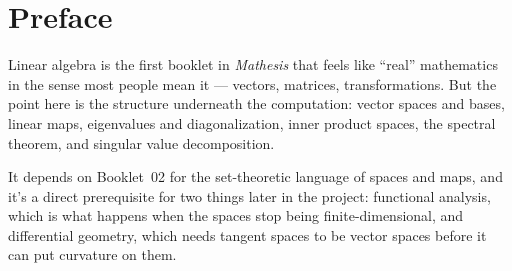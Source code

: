 \chapter*{Preface}

Linear algebra is the first booklet in \textit{Mathesis} that
feels like ``real'' mathematics in the sense most people mean it ---
vectors, matrices, transformations. But the point here is the structure
underneath the computation: vector spaces and bases, linear maps,
eigenvalues and diagonalization, inner product spaces, the spectral
theorem, and singular value decomposition.

It depends on Booklet~02 for the set-theoretic language of spaces and
maps, and it's a direct prerequisite for two things later in the
project: functional analysis, which is what happens when the spaces
stop being finite-dimensional, and differential geometry, which needs
tangent spaces to be vector spaces before it can put curvature on them.
